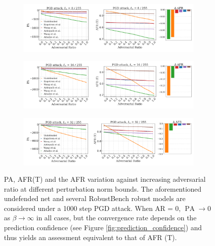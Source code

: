 \begin{figure}[H]
    \centering
    \begin{subfigure}[b]{\textwidth}
        \centering
        \includegraphics[width=\textwidth]{img/results_discussion/adversarial/PGD_0.0314_combo.png}
    \end{subfigure}

    \vspace{1em}

    \begin{subfigure}[b]{\textwidth}
        \centering
        \includegraphics[width=\textwidth]{img/results_discussion/adversarial/PGD_0.0627_combo.png}
    \end{subfigure}

    \vspace{1em}

    \begin{subfigure}[b]{\textwidth}
        \centering
        \includegraphics[width=\textwidth]{img/results_discussion/adversarial/PGD_0.1255_combo.png}
    \end{subfigure}

    \caption{PA, AFR(T) and the AFR variation against increasing adversarial ratio at different
    perturbation norm bounds. The aforementioned undefended net and several RobustBench
    robust models are considered under a 1000 step PGD attack.
    When AR = 0, $\operatorname{PA} \longrightarrow 0$ as $\beta \longrightarrow \infty$ in all cases, but
    the convergence rate depends on the prediction confidence (see Figure \ref{fig:prediction_confidence}) and thus yields an assessment equivalent to that
    of AFR (T).
    }
    \label{fig:six_figures_pa_adv}
\end{figure}

